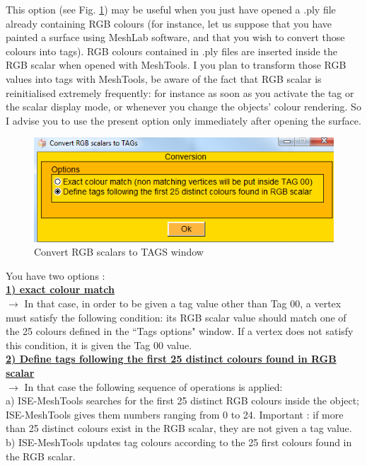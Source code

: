 This option (see Fig. \ref{rgb_conversion}) may be useful when you just have opened a .ply file already containing RGB colours (for instance, let us suppose that you have painted a surface using MeshLab software, and that you wish to convert those colours into tags). RGB colours contained in .ply files are inserted inside the RGB scalar when opened with MeshTools. I you plan to transform those RGB values into tags with MeshTools, be aware of the fact that RGB scalar is reinitialised extremely frequently: for instance as soon as you activate the tag or the scalar display mode, or whenever you change the objects' colour rendering. So I advise you to use the present option only immediately after opening the surface.
\begin{figure}
  \centering
  \includegraphics[scale=0.5]{images/Tags/Convert.png} 
	\caption{Convert RGB scalars to TAGS window}
\label{rgb_conversion}
\end{figure}
You have two options :\\
\textbf{\underline{1) exact colour match}}\\
$\rightarrow$ In that case, in order to be given a tag value other than Tag 00, a vertex must satisfy the following condition: its RGB scalar value should match one of the 25 colours defined in the ``Tags options" window. If a vertex does not satisfy this condition, it is given the Tag 00 value.\\
\textbf{\underline{2) Define tags following the first 25 distinct colours found in RGB scalar}}\\
$\rightarrow$ In that case the following sequence of operations is applied:\\
a) ISE-MeshTools searches for the first 25 distinct RGB colours inside the object; ISE-MeshTools gives them numbers ranging from 0 to 24. Important : if more than 25 distinct colours exist in the RGB scalar, they are not given a tag value.\\
b) ISE-MeshTools updates tag colours according to the 25 first colours found in the RGB scalar.\\
